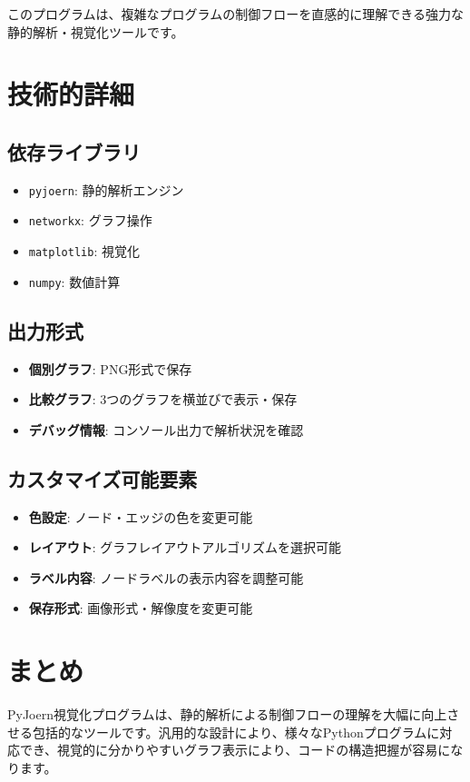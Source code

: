 \documentclass[a4paper,12pt]{article}
\begin{document}
このプログラムは、複雑なプログラムの制御フローを直感的に理解できる強力な静的解析・視覚化ツールです。

\section{技術的詳細}

\subsection{依存ライブラリ}

\begin{itemize}
    \item \texttt{pyjoern}: 静的解析エンジン
    \item \texttt{networkx}: グラフ操作
    \item \texttt{matplotlib}: 視覚化
    \item \texttt{numpy}: 数値計算
\end{itemize}

\subsection{出力形式}

\begin{itemize}
    \item \textbf{個別グラフ}: PNG形式で保存
    \item \textbf{比較グラフ}: 3つのグラフを横並びで表示・保存
    \item \textbf{デバッグ情報}: コンソール出力で解析状況を確認
\end{itemize}

\subsection{カスタマイズ可能要素}

\begin{itemize}
    \item \textbf{色設定}: ノード・エッジの色を変更可能
    \item \textbf{レイアウト}: グラフレイアウトアルゴリズムを選択可能
    \item \textbf{ラベル内容}: ノードラベルの表示内容を調整可能
    \item \textbf{保存形式}: 画像形式・解像度を変更可能
\end{itemize}

\section{まとめ}

PyJoern視覚化プログラムは、静的解析による制御フローの理解を大幅に向上させる包括的なツールです。汎用的な設計により、様々なPythonプログラムに対応でき、視覚的に分かりやすいグラフ表示により、コードの構造把握が容易になります。
\end{document}

